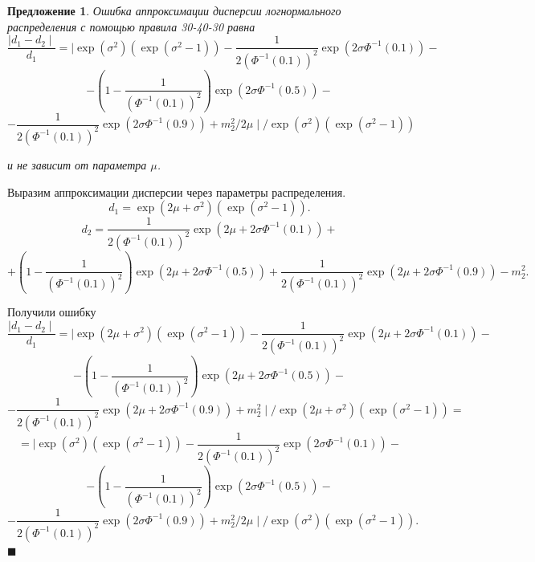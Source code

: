 \documentclass[12pt]{article}
\newtheorem{proposition}[theorem]{Предложение}
\newenvironment{Proof}{\par\noindent{\bf Доказательство.}}{\hfill$\scriptstyle\blacksquare$}
\begin{document}
\begin{proposition}\label{pr6}
Ошибка аппроксимации дисперсии логнормального распределения с помощью правила 30-40-30 равна
\[\dfrac{\mid d_{1} - d_{2} \mid}{d_{1}} = \mid \exp(\sigma^{2})(\exp(\sigma^{2}-1)) - \dfrac{1}{2(\Phi^{-1}(0.1))^{2}}\exp(2\sigma\Phi^{-1}(0.1))-\]
\[- \left(1 - \dfrac{1}{(\Phi^{-1}(0.1))^{2}}\right)\exp(2\sigma\Phi^{-1}(0.5))-\]
\[-\dfrac{1}{2(\Phi^{-1}(0.1))^{2}}\exp(2\sigma\Phi^{-1}(0.9)) + m_{2}^{2}/2\mu\mid/\exp(\sigma^{2})(\exp(\sigma^{2}-1))\]

и не зависит от параметра $\mu$.
\end{proposition}
\begin{Proof}
	Выразим аппроксимации дисперсии через параметры распределения.
	\[d_{1} = \exp(2\mu+\sigma^{2})(\exp(\sigma^{2}-1)).\]
	\[d_{2} = \dfrac{1}{2(\Phi^{-1}(0.1))^{2}}\exp(2\mu+2\sigma\Phi^{-1}(0.1))+ \]
	\[+\left(1 - \dfrac{1}{(\Phi^{-1}(0.1))^{2}}\right)\exp(2\mu+2\sigma\Phi^{-1}(0.5))+ \dfrac{1}{2(\Phi^{-1}(0.1))^{2}}\exp(2\mu+2\sigma\Phi^{-1}(0.9)) - m_{2}^{2}.\]
	
	Получили ошибку
	\[\dfrac{\mid d_{1} - d_{2} \mid}{d_{1}} = \mid \exp(2\mu+\sigma^{2})(\exp(\sigma^{2}-1)) - \dfrac{1}{2(\Phi^{-1}(0.1))^{2}}\exp(2\mu+2\sigma\Phi^{-1}(0.1))-\]
	\[- \left(1 - \dfrac{1}{(\Phi^{-1}(0.1))^{2}}\right)\exp(2\mu+2\sigma\Phi^{-1}(0.5))-\]
	\[-\dfrac{1}{2(\Phi^{-1}(0.1))^{2}}\exp(2\mu+2\sigma\Phi^{-1}(0.9)) + m_{2}^{2}\mid/\exp(2\mu+\sigma^{2})(\exp(\sigma^{2}-1))=\]
	\[=\mid \exp(\sigma^{2})(\exp(\sigma^{2}-1)) - \dfrac{1}{2(\Phi^{-1}(0.1))^{2}}\exp(2\sigma\Phi^{-1}(0.1))-\]
	\[- \left(1 - \dfrac{1}{(\Phi^{-1}(0.1))^{2}}\right)\exp(2\sigma\Phi^{-1}(0.5))-\]
	\[-\dfrac{1}{2(\Phi^{-1}(0.1))^{2}}\exp(2\sigma\Phi^{-1}(0.9)) + m_{2}^{2}/2\mu\mid/\exp(\sigma^{2})(\exp(\sigma^{2}-1)).\]
\end{Proof}
\end{document}
